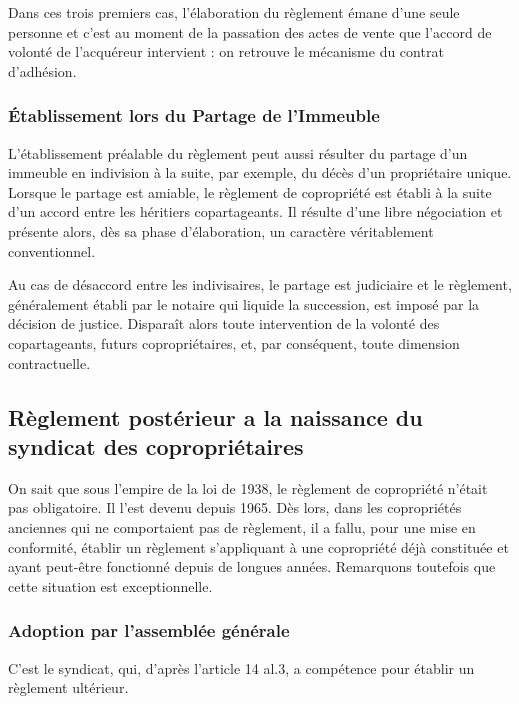 			Dans ces trois premiers cas, l'élaboration du règlement émane d'une seule personne et c'est au moment de la passation des actes de vente que l'accord de volonté de l'acquéreur intervient : on retrouve le mécanisme du contrat d'adhésion.
		
		\subsubsection{Établissement lors du Partage de l'Immeuble}
		
			L'établissement préalable du règlement peut aussi résulter du partage d'un immeuble en indivision à la suite, par exemple, du décès d'un propriétaire unique. Lorsque le partage est amiable, le règlement de copropriété est établi à la suite d'un accord entre les héritiers copartageants. Il résulte d'une libre négociation et présente alors, dès sa phase d'élaboration, un caractère véritablement conventionnel.
			
			Au cas de désaccord entre les indivisaires, le partage est judiciaire et le règlement, généralement établi par le notaire qui liquide la succession, est imposé par la décision de justice. Disparaît alors toute intervention de la volonté des copartageants, futurs copropriétaires, et, par conséquent, toute dimension contractuelle.
	
	\subsection{Règlement postérieur a la naissance du syndicat des copropriétaires}
	
		On sait que sous l'empire de la loi de 1938, le règlement de copropriété n'était pas obligatoire. Il l'est devenu depuis 1965. Dès lors, dans les copropriétés anciennes qui ne comportaient pas de règlement, il a fallu, pour une mise en conformité, établir un règlement s'appliquant à une copropriété déjà constituée et ayant peut-être fonctionné depuis de longues années. Remarquons toutefois que cette situation est exceptionnelle.

		\subsubsection{Adoption par l’assemblée générale}
		
			C'est le syndicat, qui, d'après l'article 14 al.3, a compétence pour établir un règlement ultérieur.
			
